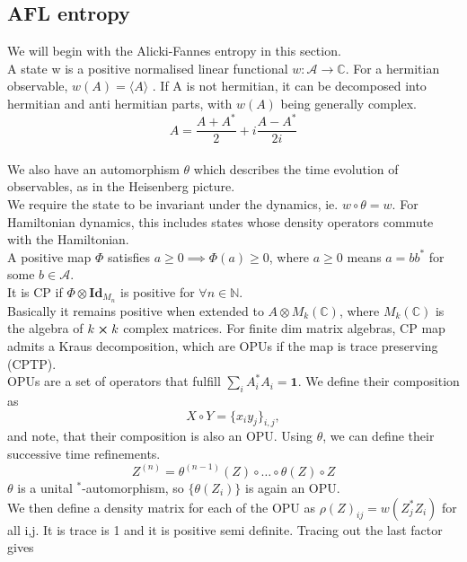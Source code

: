\documentclass{article}
\begin{document}
\subsection{AFL entropy}
We will begin with the Alicki-Fannes entropy in this section. \\
A state w is a positive normalised linear functional $w: \mathcal{A} \to \mathbb{C}$. For a hermitian observable, $w(A) = \langle A\rangle$ . If A is not hermitian, it can be decomposed into hermitian and anti hermitian parts, with $w(A)$ being generally complex. \begin{equation}
    A = \frac{A+A^*}{2} + i\frac{A-A^*}{2i}
\end{equation} \\
We also have an automorphism $\theta$ which describes the time evolution of observables, as in the Heisenberg picture.\\
We require the state to be invariant under the dynamics, ie. $w\circ \theta = w$. For Hamiltonian dynamics, this includes states whose density operators commute with the Hamiltonian.\\ 
A positive map $\Phi$ satisfies $a\geq 0 \implies \Phi(a) \geq 0$, where $a\geq0$ means $a = bb^*$ for some $b\in\mathcal{A}$.\\
It is CP if $\Phi \otimes \mathbf{Id}_{M_n}$ is positive for $\forall n\in\mathbb{N}$. \\Basically it remains positive when extended to $A \otimes M_k(\mathbb{C})$, where  $M_k(\mathbb{C})$ is the algebra of $k\cross k$ complex matrices. For finite dim matrix algebras, CP map admits a Kraus decomposition, which are OPUs if the map is trace preserving (CPTP). \\
OPUs are a set of operators that fulfill $\sum_i A^*_iA_i = \mathbf{1}$. We define their composition as
\begin{equation}
    X\circ Y = \{x_iy_j\}_{i,j},
\end{equation}and note, that their composition is also an OPU. Using $\theta$, we can define their successive time refinements.\\
\begin{equation}
    Z^{(n)} = \theta^{(n-1)}(Z)\circ\dots\circ\theta(Z)\circ Z
\end{equation}
$\theta$ is a unital $^*$-automorphism, so $\{\theta(Z_i)\}$ is again an OPU. \\
We then define a density matrix for each of the OPU as $\rho(Z)_{ij} = w(Z^*_jZ_i)$ for all i,j. It is trace is 1 and it is positive semi definite. Tracing out the last factor gives
\end{document}
